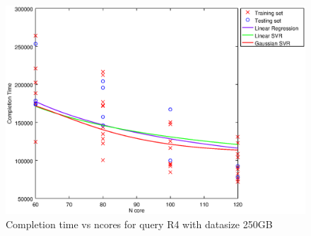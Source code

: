 
\begin {figure}[hbtp]
\centering
\includegraphics[width=\textwidth]{output/R4_250_1_OVER_NCORES/plot_R4_250_bestmodels.eps}
\caption{Completion time vs ncores for query R4 with datasize 250GB}
\label{fig:all_nonlinear_R4_250}
\end {figure}
